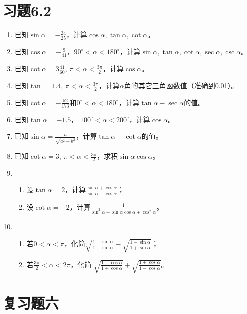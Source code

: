 \section*{习题6.2}
\begin{enumerate}
    \item 已知$\sin\alpha=-\frac{24}{25}$，计算$\cos\alpha, \tan\alpha, \cot\alpha$。
    \item 已知$\cos\alpha=-\frac{9}{41}$，$90^{\circ}<\alpha<180^{\circ}$，计算$\sin\alpha, \tan\alpha, \cot\alpha,\sec\alpha, \csc\alpha$。
\item 已知$\cot\alpha=3\frac{41}{60}$, $\pi<\alpha<\frac{3\pi}{2}$，计算$\cos\alpha$。
\item 已知$\tan=1.4$, $\pi<\alpha<\frac{3\pi}{2}$，计算$\alpha$角的其它三角函数值（准确到0.01）。
\item 已知$\cot\alpha=-\frac{52}{173}$和$0^{\circ}<\alpha<180^{\circ}$，计算$\tan\alpha-\sec\alpha$的值。
\item 已知$\tan\alpha=-1.5$， $100^{\circ}<\alpha<200^{\circ}$，计算$\cos\alpha$。
\item 已知$\sin\alpha=\frac{a}{\sqrt{a^2+b^2}}$，计算$\tan\alpha-\cot\alpha$的值。
\item 已知$\cot\alpha=3$, $\pi<\alpha<\frac{3\pi}{2}$，求积$\sin\alpha\cos\alpha$。
\item \begin{enumerate}
    \item 设$\tan\alpha=2$，计算$\frac{\sin\alpha+\cos\alpha}{\sin\alpha-\cos\alpha}$；
    \item 设$\cot\alpha=-2$，计算$\frac{1}{\sin^2\alpha-\sin\alpha\cos\alpha+\cos^2\alpha}$。
\end{enumerate}
\item \begin{enumerate}
    \item 若$0<\alpha<\pi$，化简$\sqrt{\frac{1+\sin\alpha}{1-\sin\alpha}}-\sqrt{\frac{1-\sin\alpha}{1+\sin\alpha}}$；
    \item 若$\frac{3\pi}{2}<\alpha<2\pi$，化简
    $\sqrt{\frac{1-\cos\alpha}{1+\cos\alpha}}+\sqrt{\frac{1+\cos\alpha}{1-\cos\alpha}}$。
\end{enumerate}
\end{enumerate}

\section*{复习题六}

